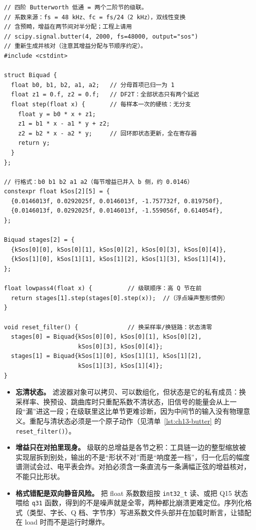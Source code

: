 \documentclass[12pt,a4paper,fontset=fandol]{ctexbook}
\newcommand{\Fn}[1]{\texttt{#1()}}
\newcommand{\Tp}[1]{\texttt{#1}}
\begin{document}
\begin{lstlisting}[style=cppstyle,label={lst:ch13-butter},caption={biquad 级联实现四阶 Butterworth 低通：系数以数组给出}]
// 四阶 Butterworth 低通 = 两个二阶节的级联。
// 系数来源：fs = 48 kHz、fc = fs/24（2 kHz），双线性变换
// 含预畸，增益在两节间对半分配；工程上请用
// scipy.signal.butter(4, 2000, fs=48000, output="sos")
// 重新生成并核对（注意其增益分配与节顺序约定）。
#include <cstdint>

struct Biquad {
  float b0, b1, b2, a1, a2;   // 分母首项已归一为 1
  float z1 = 0.f, z2 = 0.f;   // DF2T：全部状态只有两个延迟
  float step(float x) {       // 每样本一次的硬核：无分支
    float y = b0 * x + z1;
    z1 = b1 * x - a1 * y + z2;
    z2 = b2 * x - a2 * y;     // 回环即状态更新，全在寄存器
    return y;
  }
};

// 行格式：b0 b1 b2 a1 a2（每节增益已并入 b 侧，约 0.0146）
constexpr float kSos[2][5] = {
  {0.0146013f, 0.0292025f, 0.0146013f, -1.757732f, 0.819750f},
  {0.0146013f, 0.0292025f, 0.0146013f, -1.559056f, 0.614054f},
};

Biquad stages[2] = {
  {kSos[0][0], kSos[0][1], kSos[0][2], kSos[0][3], kSos[0][4]},
  {kSos[1][0], kSos[1][1], kSos[1][2], kSos[1][3], kSos[1][4]},
};

float lowpass4(float x) {          // 级联顺序：高 Q 节在前
  return stages[1].step(stages[0].step(x));  //（浮点噪声整形惯例）
}

void reset_filter() {              // 换采样率/换链路：状态清零
  stages[0] = Biquad{kSos[0][0], kSos[0][1], kSos[0][2],
                     kSos[0][3], kSos[0][4]};
  stages[1] = Biquad{kSos[1][0], kSos[1][1], kSos[1][2],
                     kSos[1][3], kSos[1][4]};
}
\end{lstlisting}

\begin{warning}[title={状态、增益与格式：搬系数最容易断的三处}]
\begin{itemize}
\item \textbf{忘清状态。} 滤波器对象可以拷贝、可以数组化，但状态是它的私有成员：换采样率、换预设、跳曲库时只重配系数不清状态，旧信号的能量会从上一段``漏''进这一段；在级联里这比单节更难诊断，因为中间节的输入没有物理意义。重配与清状态必须是一个原子动作（见清单~\ref{lst:ch13-butter} 的 \Fn{reset\_filter}）。
\item \textbf{增益只在对拍里现身。} 级联的总增益是各节之积：工具链一边的整型缩放被实现层拆到别处，输出的不是``形状不对''而是``响度差一档''，归一化后的幅度谱测试会过、电平表会炸。对拍必须含一条直流与一条满幅正弦的增益核对，不能只比形状。
\item \textbf{格式错配是双向静音风险。} 把 float 系数数组按 \Tp{int32\_t} 读、或把 Q15 状态喂给 \Tp{q31} 函数，得到的不是噪声就是全零，两种都比崩溃更难定位。序列化格式（类型、字长、Q 档、字节序）写进系数文件头部并在加载时断言，让错配在 load 时而不是运行时爆炸。
\end{itemize}
\end{warning}
\end{document}
